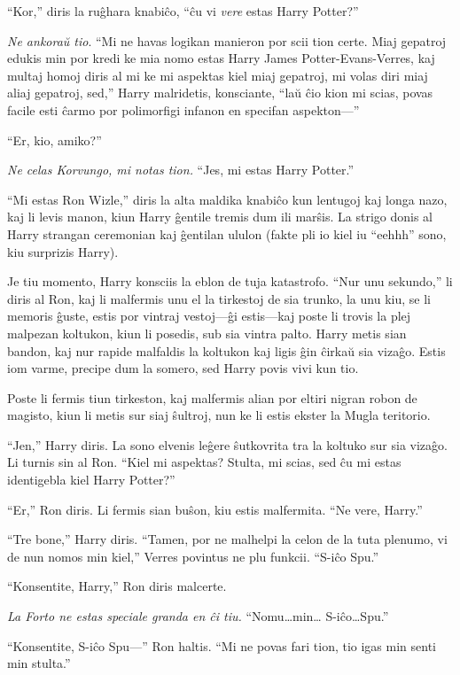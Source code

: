 ``Kor,'' diris la ruĝhara knabiĉo, ``ĉu vi \emph{vere} estas Harry Potter?''

\emph{Ne ankoraŭ tio}. ``Mi ne havas logikan manieron por scii tion
certe. Miaj gepatroj edukis min por kredi ke mia nomo estas Harry
James Potter-Evans-Verres, kaj multaj homoj diris al mi ke mi aspektas
kiel miaj gepatroj, mi volas diri miaj aliaj gepatroj, sed,'' Harry
malridetis, konsciante, ``laŭ ĉio kion mi scias, povas facile esti ĉarmo
por polimorfigi infanon en specifan aspekton—''

``Er, kio, amiko?''

\emph{Ne celas Korvungo, mi notas tion.} ``Jes, mi estas Harry Potter.''

``Mi estas Ron Wizle,'' diris la alta maldika knabiĉo kun lentugoj
kaj longa nazo, kaj li levis manon, kiun Harry ĝentile tremis dum ili
marŝis. La strigo donis al Harry strangan ceremonian kaj ĝentilan
ululon (fakte pli io kiel iu ``eehhh'' sono, kiu surprizis Harry).

Je tiu momento, Harry konsciis la eblon de tuja katastrofo. ``Nur unu
sekundo,'' li diris al Ron, kaj li malfermis unu el la tirkestoj de sia
trunko, la unu kiu, se li memoris ĝuste, estis por vintraj vestoj—ĝi
estis—kaj poste li trovis la plej malpezan koltukon, kiun li posedis, sub
sia vintra palto. Harry metis sian bandon, kaj nur rapide malfaldis
la koltukon kaj ligis ĝin ĉirkaŭ sia vizaĝo. Estis iom varme, precipe
dum la somero, sed Harry povis vivi kun tio.

Poste li fermis tiun tirkeston, kaj malfermis alian por eltiri nigran
robon de magisto, kiun li metis sur siaj ŝultroj, nun ke li estis
ekster la Mugla teritorio.

``Jen,'' Harry diris. La sono elvenis leĝere ŝutkovrita tra la koltuko
sur sia vizaĝo. Li turnis sin al Ron. ``Kiel mi aspektas? Stulta, mi
scias, sed ĉu mi estas identigebla kiel Harry Potter?''

``Er,'' Ron diris. Li fermis sian buŝon, kiu estis malfermita. ``Ne
vere, Harry.''

``Tre bone,'' Harry diris. ``Tamen, por ne malhelpi la celon de la
tuta plenumo, vi de nun nomos min kiel,'' Verres povintus ne plu
funkcii. ``S-iĉo Spu.''

``Konsentite, Harry,'' Ron diris malcerte.

\emph{La Forto ne estas speciale granda en ĉi tiu.} ``Nomu\ldots min\ldots
S-iĉo\ldots Spu.''

``Konsentite, S-iĉo Spu—'' Ron haltis. ``Mi ne povas fari tion, tio igas min
senti min stulta.''

